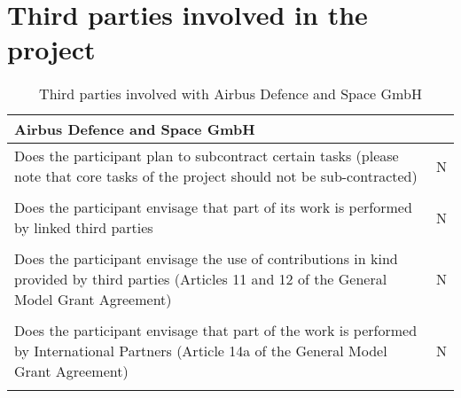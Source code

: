 \section{Third parties involved in the project}

\begin{table}[H]
	\centering
	\begin{tabular}{|p{10cm}|p{4cm}|}
		\hline
		
		\multicolumn{2}{|p{14cm}|}{\textbf{Airbus Defence and Space GmbH}}\\
		
		\hline
		
		Does the participant plan to subcontract certain tasks (please note that core tasks of the project should not be sub-contracted) & N\\
		
		\hline
		
		\multicolumn{2}{|p{14cm}|}{}\\
		
		\hline
		
		Does the participant envisage that part of its work is performed by linked third parties & N\\
		
		\hline
		
		\multicolumn{2}{|p{14cm}|}{}\\
		
		\hline
		
		Does the participant envisage the use of contributions in kind provided by third parties (Articles 11 and 12 of the General Model Grant Agreement) & N\\
		
		\hline
		
		\multicolumn{2}{|p{14cm}|}{}\\
		
		\hline
		
		Does the participant envisage that part of the work is performed by International Partners (Article 14a of the General Model Grant Agreement) & N\\
		
		\hline
		
		\multicolumn{2}{|p{14cm}|}{}\\
		
		\hline
	\end{tabular}
	\caption{Third parties involved with Airbus Defence and Space GmbH}
\end{table}



